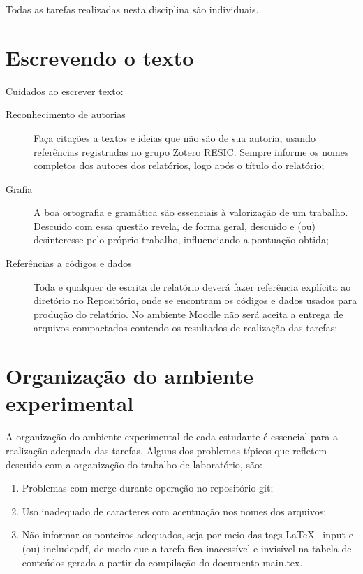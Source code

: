 Todas as tarefas realizadas nesta disciplina são individuais. 

\section{Escrevendo o texto}

Cuidados ao escrever texto:
\begin{description}
\item [Reconhecimento de autorias] Faça citações a textos e ideias que não são de sua autoria, usando referências registradas no grupo Zotero RESIC. Sempre informe os nomes completos dos autores dos relatórios, logo após o título do relatório;
\item [Grafia] A boa ortografia e gramática são essenciais à valorização de um trabalho. Descuido com essa questão revela, de forma geral, descuido e (ou) desinteresse pelo próprio trabalho, influenciando a pontuação obtida;
\item [Referências a códigos e dados] Toda e qualquer de escrita de relatório deverá fazer referência explícita ao diretório no Repositório, onde se encontram os códigos e dados usados para produção do relatório. No ambiente Moodle não será aceita a entrega de arquivos compactados contendo os resultados de realização das tarefas;
\end{description}

\section{Organização do ambiente experimental}

A organização do ambiente experimental de cada estudante é essencial para a realização adequada das tarefas.
Alguns dos problemas típicos que refletem descuido com a organização do trabalho de laboratório, são:

\begin{enumerate}
\item Problemas com merge durante operação no repositório git;
\item Uso inadequado de caracteres com acentuação nos nomes dos arquivos;
\item Não informar os ponteiros adequados, seja por meio das tags \LaTeX~ input e (ou) includepdf, de modo que a tarefa fica inacessível e invisível na tabela de conteúdos gerada a partir da compilação do documento main.tex.
\end{enumerate}

